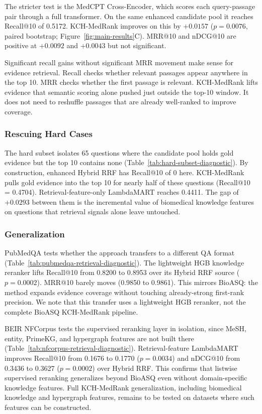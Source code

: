 The stricter test is the MedCPT Cross-Encoder, which scores each query-passage pair through a full transformer. On the same enhanced candidate pool it reaches Recall@10 of 0.5172. KCH-MedRank improves on this by $+0.0157$ ($p=0.0076$, paired bootstrap; Figure~\ref{fig:main-results}C). MRR@10 and nDCG@10 are positive at $+0.0092$ and $+0.0043$ but not significant.

Significant recall gains without significant MRR movement make sense for evidence retrieval. Recall checks whether relevant passages appear anywhere in the top 10. MRR checks whether the first passage is relevant. KCH-MedRank lifts evidence that semantic scoring alone pushed just outside the top-10 window. It does not need to reshuffle passages that are already well-ranked to improve coverage.

\subsubsection{Rescuing Hard Cases}

The hard subset isolates 65 questions where the candidate pool holds gold evidence but the top 10 contains none (Table~\ref{tab:hard-subset-diagnostic}). By construction, enhanced Hybrid RRF has Recall@10 of 0 here. KCH-MedRank pulls gold evidence into the top 10 for nearly half of these questions (Recall@10 = 0.4704). Retrieval-feature-only LambdaMART reaches 0.4411. The gap of $+0.0293$ between them is the incremental value of biomedical knowledge features on questions that retrieval signals alone leave untouched.



\subsubsection{Generalization}

PubMedQA tests whether the approach transfers to a different QA format (Table~\ref{tab:pubmedqa-retrieval-diagnostic}). The lightweight HGB knowledge reranker lifts Recall@10 from 0.8200 to 0.8953 over its Hybrid RRF source ($p=0.0002$). MRR@10 barely moves (0.9850 to 0.9861). This mirrors BioASQ: the method expands evidence coverage without touching already-strong first-rank precision. We note that this transfer uses a lightweight HGB reranker, not the complete BioASQ KCH-MedRank pipeline.



BEIR NFCorpus tests the supervised reranking layer in isolation, since MeSH, entity, PrimeKG, and hypergraph features are not built there (Table~\ref{tab:nfcorpus-retrieval-diagnostic}). Retrieval-feature LambdaMART improves Recall@10 from 0.1676 to 0.1770 ($p=0.0034$) and nDCG@10 from 0.3436 to 0.3627 ($p=0.0002$) over Hybrid RRF. This confirms that listwise supervised reranking generalizes beyond BioASQ even without domain-specific knowledge features. Full KCH-MedRank generalization, including biomedical knowledge and hypergraph features, remains to be tested on datasets where such features can be constructed.


